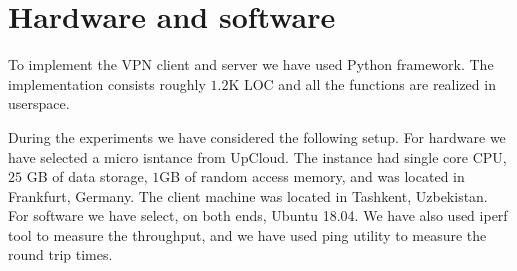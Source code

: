 \section{Hardware and software}
\label{sec:hardware}

To implement the VPN client and server we have used Python framework. The implementation
consists roughly $1.2$K LOC and all the functions are realized in userspace.

During the experiments we have considered the following setup.
For hardware we have selected a micro isntance from UpCloud. The instance had 
single core CPU, $25$ GB of data storage, $1$GB of random access memory, and was 
located in Frankfurt, Germany. The client machine was located in Tashkent, Uzbekistan. 
For software we have select, on both ends, Ubuntu 18.04. We have also used iperf tool 
to measure the throughput, and we have used ping utility to measure the round trip times. 

